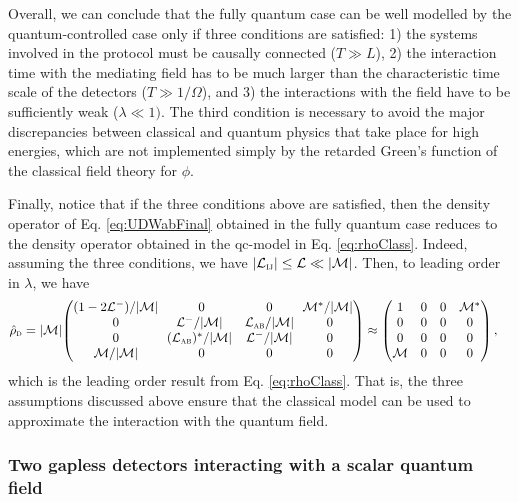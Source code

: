 \documentclass[letterpaper,12pt,titlepage,oneside,final]{book}
\newcommand{\tc}[1]{\textsc{#1}}
\begin{document}
Overall, we can conclude that the {fully} quantum case can be well modelled by the {quantum-controlled} case only if three conditions are satisfied: 1) the systems involved in the protocol must be causally connected ($T\gg L$), 2) the interaction time with the mediating field has to be much larger than the characteristic time scale of the detectors ($T \gg 1/\Omega$), and 3) the interactions with the field have to be sufficiently weak ($\lambda\ll 1)$. {The third condition is necessary to avoid the major discrepancies between classical and quantum physics that take place for high energies, {which are not implemented simply by the retarded Green's function of the classical field theory for $\phi$}.} 

Finally, notice that if the three conditions above are satisfied, then the density operator of Eq. \eqref{eq:UDWabFinal} obtained in the fully quantum case reduces to the density operator obtained in the {qc-model} in Eq. \eqref{eq:rhoClass}. Indeed, assuming the three conditions, we have $|\mathcal{L}_{\tc{ij}}|\leq \mathcal{L}\ll |\mathcal{M}|$. Then, to leading order in $\lambda$, we have
\begin{align}
    \hat{\rho}_\tc{d} = |\mathcal{M}|&\!\begin{pmatrix}
    (1 - 2{\mathcal{L}^-})/{|\mathcal{M}|} & 0 & 0& \!\!{\mathcal{M}^*}/{|\mathcal{M}|}\\
    0 & \!\!{\mathcal{L}^-}/{|\mathcal{M}|} & {\mathcal{L}_{\tc{ab}}}/{|\mathcal{M}|} & 0 \\ 
    0 & \!\!{(\mathcal{L}_\tc{ab})^*}/{|\mathcal{M}|} & {\mathcal{L}^-}/{|\mathcal{M}|} & 0\\
    {\mathcal{M}}/{|\mathcal{M}|} & 0& 0& 0\end{pmatrix}\nonumber\approx \begin{pmatrix}
    1  & 0 & 0 & {\mathcal{M}^*}\\
    0 & 0 & 0 & 0 \\ 
    0 & 0 & 0 & 0\\
    {\mathcal{M}} & 0& 0& 0\end{pmatrix},
\end{align}
which is the leading order result from Eq. \eqref{eq:rhoClass}. That is, the three assumptions discussed above ensure that the classical model can be used to approximate the interaction with the quantum field.


\subsubsection*{Two gapless detectors interacting with a scalar quantum field}
\end{document}
